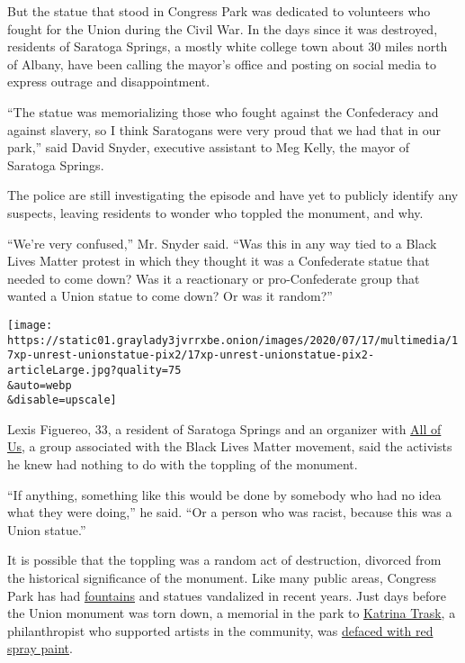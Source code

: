 But the statue that stood in Congress Park was dedicated to volunteers
who fought for the Union during the Civil War. In the days since it was
destroyed, residents of Saratoga Springs, a mostly white college town
about 30 miles north of Albany, have been calling the mayor's office and
posting on social media to express outrage and disappointment.

``The statue was memorializing those who fought against the Confederacy
and against slavery, so I think Saratogans were very proud that we had
that in our park,'' said David Snyder, executive assistant to Meg Kelly,
the mayor of Saratoga Springs.

The police are still investigating the episode and have yet to publicly
identify any suspects, leaving residents to wonder who toppled the
monument, and why.

``We're very confused,'' Mr. Snyder said. ``Was this in any way tied to
a Black Lives Matter protest in which they thought it was a Confederate
statue that needed to come down? Was it a reactionary or pro-Confederate
group that wanted a Union statue to come down? Or was it random?''

\texttt{[image: https://static01.graylady3jvrrxbe.onion/images/2020/07/17/multimedia/17xp-unrest-unionstatue-pix2/17xp-unrest-unionstatue-pix2-articleLarge.jpg?quality=75\\\&auto=webp\\\&disable=upscale]}

Lexis Figuereo, 33, a resident of Saratoga Springs and an organizer with
\href{https://www.facebookcorewwwi.onion/UntitledAndFree/}{All of Us}, a
group associated with the Black Lives Matter movement, said the
activists he knew had nothing to do with the toppling of the monument.

``If anything, something like this would be done by somebody who had no
idea what they were doing,'' he said. ``Or a person who was racist,
because this was a Union statue.''

It is possible that the toppling was a random act of destruction,
divorced from the historical significance of the monument. Like many
public areas, Congress Park has had
\href{https://cbs6albany.com/news/local/man-arrested-in-connection-to-congress-park-vandalism}{fountains}
and statues vandalized in recent years. Just days before the Union
monument was torn down, a memorial in the park to
\href{https://www.saratoga.com/aboutsaratoga/history/katrina-trask/}{Katrina
Trask}, a philanthropist who supported artists in the community, was
\href{https://wnyt.com/saratoga-county-ny-news/vandals-deface-new-500000-entrance-to-congress-park/5791939/}{defaced
with red spray paint}.

